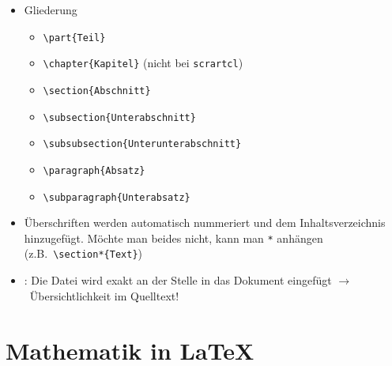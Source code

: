 \begin{frame}[<+->][fragile]
	\begin{itemize}
		\item Gliederung
		\begin{itemize}
			\item \lstinline!\part{Teil}!
			\item \lstinline!\chapter{Kapitel}! (nicht bei \texttt{scrartcl})
			\item \lstinline!\section{Abschnitt}!
			\item \lstinline!\subsection{Unterabschnitt}!
			\item \lstinline!\subsubsection{Unterunterabschnitt}!
			\item \lstinline!\paragraph{Absatz}!
			\item \lstinline!\subparagraph{Unterabsatz}!
		\end{itemize}
		\item Überschriften werden automatisch nummeriert und dem Inhaltsverzeichnis hinzugefügt. Möchte man beides nicht, kann man \lstinline!*! anhängen (z.B.\ \lstinline!\section*{Text}!)
		\item \lstinline!!: Die Datei wird exakt an der Stelle in das Dokument eingefügt $\rightarrow$\ Übersichtlichkeit im Quelltext!
	\end{itemize}
\end{frame}

\section{Mathematik in \LaTeX}

